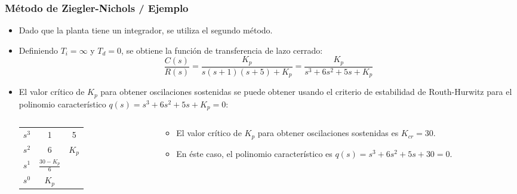 \documentclass[aspectratio=169,handout]{beamer}
\theoremstyle{definition}
\theoremstyle{plain}
\theoremstyle{remark}
\begin{document}
\begin{frame}[<+->]\frametitle{Método de Ziegler-Nichols / Ejemplo}
\begin{itemize}
	\item Dado que la planta tiene un integrador, se utiliza el segundo método.
	\item Definiendo $T_i = \infty$ y $T_d = 0$, se obtiene la función de transferencia de lazo cerrado:
	\begin{equation*}
		\frac{C(s)}{R(s)} = \frac{K_p}{s(s+1)(s+5) + K_p} = \frac{K_p}{s^3 + 6s^2 + 5s + K_p}
	\end{equation*}
	\item El valor crítico de $K_p$ para obtener oscilaciones sostenidas se puede obtener usando el criterio de estabilidad de Routh-Hurwitz para el polinomio característico $q(s) = s^3 + 6s^2 + 5s + K_p = 0$:
	\begin{columns}
	\begin{column}{0.4\textwidth}
		\begin{table}
		\begin{tabular}{c|cc}
			$s^3$ & 1 & 5\\
			$s^2$ & 6 & $K_p$\\
			$s^1$ & $\frac{30-K_p}{6}$ & \\
			$s^0$ & $K_p$ & 
		\end{tabular}
		\end{table}
	\end{column}	
	\begin{column}{0.6\textwidth}
		\begin{itemize}
			\item El valor crítico de $K_p$ para obtener oscilaciones sostenidas es $K_{cr} = 30$.
			\item En éste caso, el polinomio característico es $q(s) = s^3 + 6s^2 + 5s + 30 = 0$.
		\end{itemize}
	\end{column}	
	\end{columns}
\end{itemize}
\end{frame}
\end{document}
